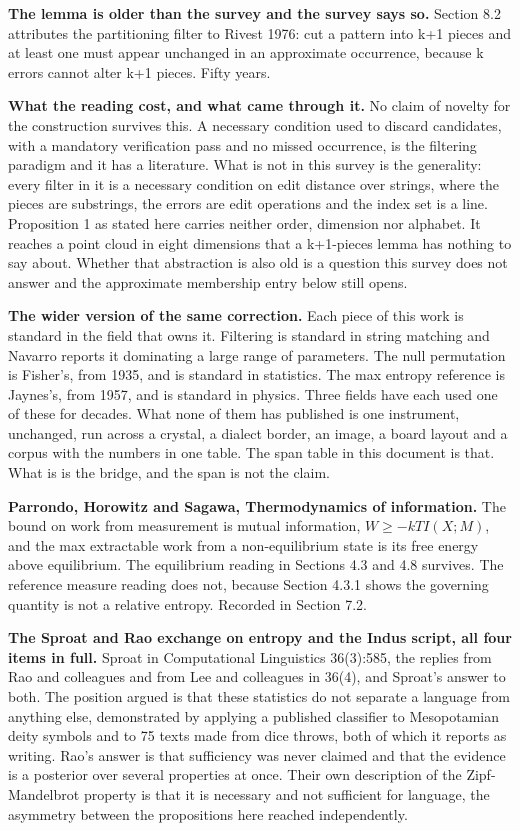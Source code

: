 \textbf{The lemma is older than the survey and the survey says so.} Section 8.2 attributes the partitioning filter to Rivest 1976: cut a pattern into k+1 pieces and at least one must appear unchanged in an approximate occurrence, because k errors cannot alter k+1 pieces. Fifty years.

\textbf{What the reading cost, and what came through it.} No claim of novelty for the construction survives this. A necessary condition used to discard candidates, with a mandatory verification pass and no missed occurrence, is the filtering paradigm and it has a literature. What is not in this survey is the generality: every filter in it is a necessary condition on edit distance over strings, where the pieces are substrings, the errors are edit operations and the index set is a line. Proposition 1 as stated here carries neither order, dimension nor alphabet. It reaches a point cloud in eight dimensions that a k+1-pieces lemma has nothing to say about. Whether that abstraction is also old is a question this survey does not answer and the approximate membership entry below still opens.

\textbf{The wider version of the same correction.} Each piece of this work is standard in the field that owns it. Filtering is standard in string matching and Navarro reports it dominating a large range of parameters. The null permutation is Fisher's, from 1935, and is standard in statistics. The max entropy reference is Jaynes's, from 1957, and is standard in physics. Three fields have each used one of these for decades. What none of them has published is one instrument, unchanged, run across a crystal, a dialect border, an image, a board layout and a corpus with the numbers in one table. The span table in this document is that. What is is the bridge, and the span is not the claim.

\textbf{Parrondo, Horowitz and Sagawa, Thermodynamics of information.} The bound on work from measurement is mutual information, \(W \ge -kTI(X;M)\), and the max extractable work from a non-equilibrium state is its free energy above equilibrium. The equilibrium reading in Sections 4.3 and 4.8 survives. The reference measure reading does not, because Section 4.3.1 shows the governing quantity is not a relative entropy. Recorded in Section 7.2.

\textbf{The Sproat and Rao exchange on entropy and the Indus script, all four items in full.} Sproat in Computational Linguistics 36(3):585, the replies from Rao and colleagues and from Lee and colleagues in 36(4), and Sproat's answer to both. The position argued is that these statistics do not separate a language from anything else, demonstrated by applying a published classifier to Mesopotamian deity symbols and to 75 texts made from dice throws, both of which it reports as writing. Rao's answer is that sufficiency was never claimed and that the evidence is a posterior over several properties at once. Their own description of the Zipf-Mandelbrot property is that it is necessary and not sufficient for language, the asymmetry between the propositions here reached independently.

